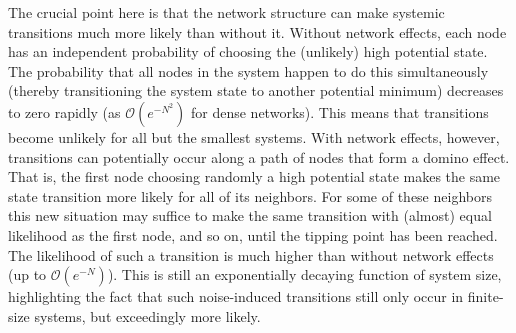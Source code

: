 \documentclass[a4paper, 11pt, twocolumn]{article}
\begin{document}
The crucial point here is that the network structure can make systemic transitions much more likely than without it. Without network effects, each node has an independent probability of choosing the (unlikely) high potential state. The probability that all nodes in the system happen to do this simultaneously (thereby transitioning the system state to another potential minimum) decreases to zero rapidly (as $\mathcal{O}(e^{-N^2})$ for dense networks). This means that transitions become unlikely for all but the smallest systems. With network effects, however, transitions can potentially occur along a path of nodes that form a domino effect. That is, the first node choosing randomly a high potential state makes the same state transition more likely for all of its neighbors. For some of these neighbors this new situation may suffice to make the same transition with (almost) equal likelihood as the first node, and so on, until the tipping point has been reached. The likelihood of such a transition is much higher than without network effects (up to $\mathcal{O}(e^{-N})$). This is still an exponentially decaying function of system size, highlighting the fact that such noise-induced transitions still only occur in finite-size systems, but exceedingly more likely.
\end{document}
